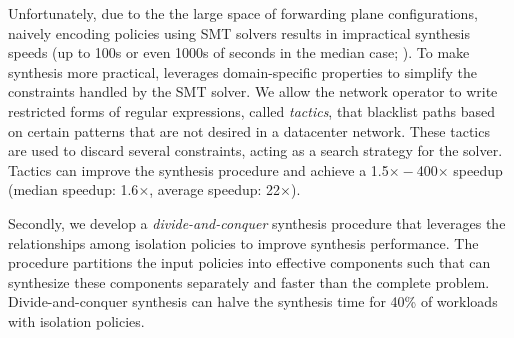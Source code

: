 
Unfortunately, due to the the large space of forwarding plane
configurations, naively encoding policies using SMT solvers results in
impractical synthesis speeds (up to 100s or even 1000s of seconds in
the median case; ).
To make synthesis more practical, \Name leverages domain-specific
properties to simplify the constraints handled by the SMT solver.
We allow the network operator to write restricted
forms of regular expressions, called \emph{tactics}, that blacklist
paths based on certain patterns that are not desired in a datacenter
network.
These tactics are used to discard several constraints, 
acting as a search strategy for the solver.
Tactics can improve the synthesis procedure and achieve
a 1.5$\times - $400$\times$ speedup 
(median speedup: 1.6$\times$, average speedup: 22$\times$).

 Secondly, we develop a \emph{divide-and-conquer} synthesis procedure
 that leverages the relationships among  isolation policies to
 improve synthesis performance. The procedure partitions the input
 policies into effective components such that \name can synthesize
 these components separately and faster than the complete problem.
 Divide-and-conquer synthesis can halve the synthesis time for 40\% of
 workloads with isolation policies.


